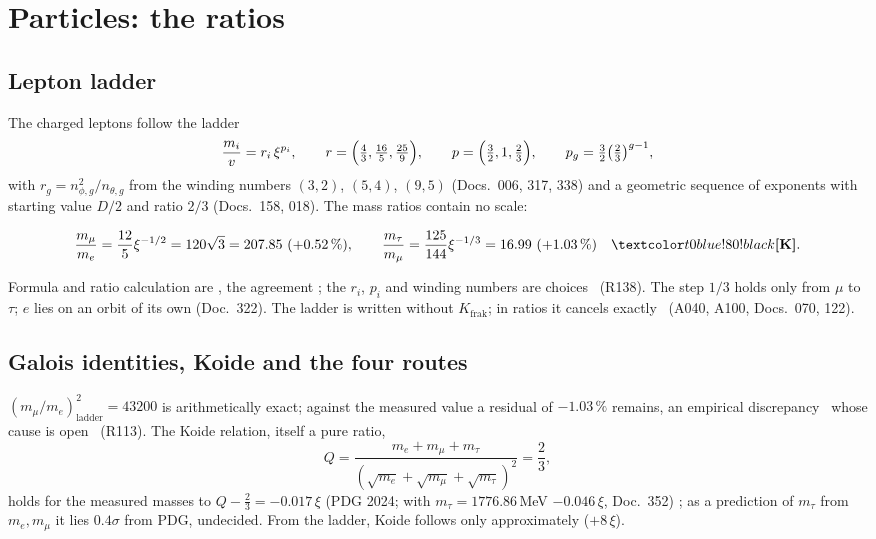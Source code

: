 \section{Particles: the ratios}

\subsection{Lepton ladder}

The charged leptons follow the ladder
\begin{equation}
  \frac{m_i}{v}=r_i\,\xi^{p_i},\qquad r=\Bigl(\tfrac43,\tfrac{16}{5},\tfrac{25}{9}\Bigr),\qquad
  p=\Bigl(\tfrac32,1,\tfrac23\Bigr),\qquad p_g=\tfrac32\bigl(\tfrac23\bigr)^{g-1},
\end{equation}
with $r_g=n_{\phi,g}^2/n_{\theta,g}$ from the winding numbers $(3,2)$, $(5,4)$, $(9,5)$
(Docs.~006, 317, 338) and a geometric sequence of exponents with starting value $D/2$ and ratio
$2/3$ (Docs.~158, 018). The mass ratios contain no scale:
\begin{ffkern}
\begin{equation}
  \frac{m_\mu}{m_e}=\frac{12}{5}\xi^{-1/2}=120\sqrt3=207.85\ (+0.52\,\%),\qquad
  \frac{m_\tau}{m_\mu}=\frac{125}{144}\xi^{-1/3}=16.99\ (+1.03\,\%)\quad\KM .
\end{equation}
\end{ffkern}%
Formula and ratio calculation are \BM, the agreement \KM; the $r_i$, $p_i$ and winding numbers are
choices \SM\ (R138). The step $1/3$ holds only from $\mu$ to $\tau$; $e$ lies on an orbit of its
own (Doc.~322). The ladder is written without $K_{\text{frak}}$; in ratios it cancels exactly
\BM\ (A040, A100, Docs.~070, 122).

\subsection{Galois identities, Koide and the four routes}

$(m_\mu/m_e)^2_{\text{ladder}}=43200$ is arithmetically exact; against the measured value a
residual of $-1.03\,\%$ remains, an empirical discrepancy \KM\ whose cause is open \SM\ (R113).
The Koide relation, itself a pure ratio,
\begin{equation}
  Q=\frac{m_e+m_\mu+m_\tau}{(\sqrt{m_e}+\sqrt{m_\mu}+\sqrt{m_\tau})^2}=\frac23 ,
\end{equation}
holds for the measured masses to $Q-\tfrac23=-0.017\,\xi$ (PDG 2024; with
$m_\tau=1776.86$\,MeV $-0.046\,\xi$, Doc.~352) \KM; as a prediction of $m_\tau$ from
$m_e,m_\mu$ it lies $0.4\sigma$ from PDG, undecided. From the ladder, Koide follows only
approximately ($+8\,\xi$).


